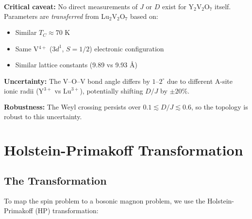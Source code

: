 \documentclass[11pt,letterpaper]{article}
\begin{document}
\begin{assumption}[title={Parameter Transfer Assumption}]
\textbf{Critical caveat:} No direct measurements of $J$ or $D$ exist for Y$_2$V$_2$O$_7$ itself. Parameters are \emph{transferred} from Lu$_2$V$_2$O$_7$ based on:
\begin{itemize}
    \item Similar $T_C \approx 70$ K
    \item Same V$^{4+}$ ($3d^1$, $S=1/2$) electronic configuration
    \item Similar lattice constants (9.89 vs 9.93 \AA)
\end{itemize}

\textbf{Uncertainty:} The V--O--V bond angle differs by $1$--$2^\circ$ due to different A-site ionic radii (Y$^{3+}$ vs Lu$^{3+}$), potentially shifting $D/J$ by $\pm 20\%$.

\textbf{Robustness:} The Weyl crossing persists over $0.1 \lesssim D/J \lesssim 0.6$, so the topology is robust to this uncertainty.
\end{assumption}

\section{Holstein-Primakoff Transformation}

\subsection{The Transformation}

To map the spin problem to a bosonic magnon problem, we use the Holstein-Primakoff (HP) transformation:
\end{document}
